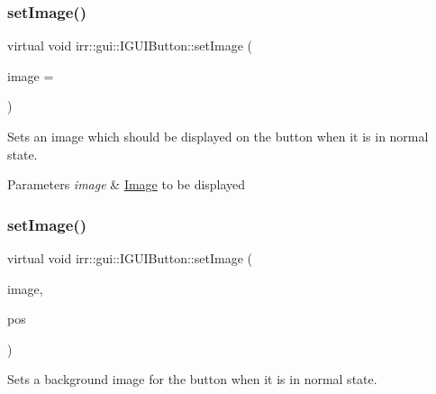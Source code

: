 \subsubsection{\texorpdfstring{set\+Image()}{setImage()}\hspace{0.1cm}{\footnotesize\ttfamily [1/2]}}
{\footnotesize\ttfamily virtual void irr\+::gui\+::\+I\+G\+U\+I\+Button\+::set\+Image (\begin{DoxyParamCaption}\item[{\hyperlink{classirr_1_1video_1_1ITexture}{video\+::\+I\+Texture} $\ast$}]{image = {} }\end{DoxyParamCaption})\hspace{0.3cm}{\ttfamily [pure virtual]}}



Sets an image which should be displayed on the button when it is in normal state. 


\begin{DoxyParams}{Parameters}
{\em image} & \hyperlink{classImage}{Image} to be displayed \\
\hline
\end{DoxyParams}
\mbox{\label{classirr_1_1gui_1_1IGUIButton_a205490ec6b4978afe9d3f6a4aed92b50}} 
\subsubsection{\texorpdfstring{set\+Image()}{setImage()}\hspace{0.1cm}{\footnotesize\ttfamily [2/2]}}
{\footnotesize\ttfamily virtual void irr\+::gui\+::\+I\+G\+U\+I\+Button\+::set\+Image (\begin{DoxyParamCaption}\item[{\hyperlink{classirr_1_1video_1_1ITexture}{video\+::\+I\+Texture} $\ast$}]{image,  }\item[{const \hyperlink{classirr_1_1core_1_1rect}{core\+::rect}$<$ \hyperlink{namespaceirr_ac66849b7a6ed16e30ebede579f9b47c6}{s32} $>$ \&}]{pos }\end{DoxyParamCaption})\hspace{0.3cm}{\ttfamily [pure virtual]}}



Sets a background image for the button when it is in normal state. 


